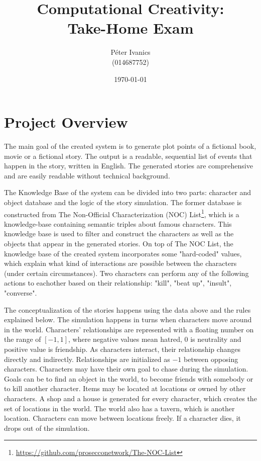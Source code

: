 \documentclass[english]{tktltiki}
\begin{document}
    \singlespacing
    
    \title{Computational Creativity: \\
    Take-Home Exam}
    
    \author{P\'eter Ivanics \\
    (014687752)}
    
    \date{\today}
    
    \maketitle
    
    
    \section{Project Overview}
    The main goal of the created system is to generate plot points of a fictional book, movie or a fictional story. The output is a readable, sequential list of events that happen in the story, written in English. The generated stories are comprehensive and are easily readable without technical background. 
    
    The Knowledge Base of the system can be divided into two parts: character and object database and the logic of the story simulation. The former database is constructed from The Non-Official Characterization (NOC) List\footnote{\url{https://github.com/prosecconetwork/The-NOC-List}}, which is a knowledge-base containing semantic triples about famous characters. This knowledge base is used to filter and construct the characters as well as the objects that appear in the generated stories. On top of The NOC List, the knowledge base of the created system incorporates some "hard-coded" values, which explain what kind of interactions are possible between the characters (under certain circumstances). Two characters can perform any of the following actions to eachother based on their relationship: "kill", "beat up", "insult", "converse".
    
    The conceptualization of the stories happens using the data above and the rules explained below. The simulation happens in turns when characters move around in the world.  Characters' relationships are represented with a floating number on the range of $[-1, 1]$, where negative values mean hatred, $0$ is neutrality and positive value is friendship. As characters interact, their relationship changes directly and indirectly. Relationships are initialized as $-1$ between opposing characters. Characters may have their own goal to chase during the simulation. Goals can be to find an object in the world, to become friends with somebody or to kill another character. Items may be located at locations or owned by other characters. A shop and a house is generated for every character, which creates the set of locations in the world. The world also has a tavern, which is another location. Characters can move between locations freely. If a character dies, it drops out of the simulation. 
\end{document}
